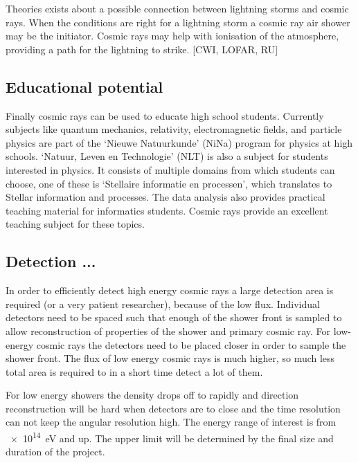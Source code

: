 Theories exists about a possible connection between lightning storms and cosmic rays. When the conditions are right for a lightning storm a cosmic ray air shower may be the initiator. Cosmic rays may help with ionisation of the atmosphere, providing a path for the lightning to strike. [CWI, LOFAR, RU]

\subsection{Educational potential}

Finally cosmic rays can be used to educate high school students. Currently subjects like quantum mechanics, relativity, electromagnetic fields, and particle physics are part of the `Nieuwe Natuurkunde' (NiNa) program for physics at high schools. `Natuur, Leven en Technologie' (NLT) is also a subject for students interested in physics. It consists of multiple domains from which students can choose, one of these is `Stellaire informatie en processen', which translates to Stellar information and processes. The data analysis also provides practical teaching material for informatics students. Cosmic rays provide an excellent teaching subject for these topics.

\subsection{Detection ...}

In order to efficiently detect high energy cosmic rays a large detection area is required (or a very patient researcher), because of the low flux. Individual detectors need to be spaced such that enough of the shower front is sampled to allow reconstruction of properties of the shower and primary cosmic ray. For low-energy cosmic rays the detectors need to be placed closer in order to sample the shower front. The flux of low energy cosmic rays is much higher, so much less total area is required to in a short time detect a lot of them.

For low energy showers the density drops off to rapidly and direction reconstruction will be hard when detectors are to close and the time resolution can not keep the angular resolution high. The energy range of interest is from \SI{e14}{\eV} and up. The upper limit will be determined by the final size and duration of the project.

